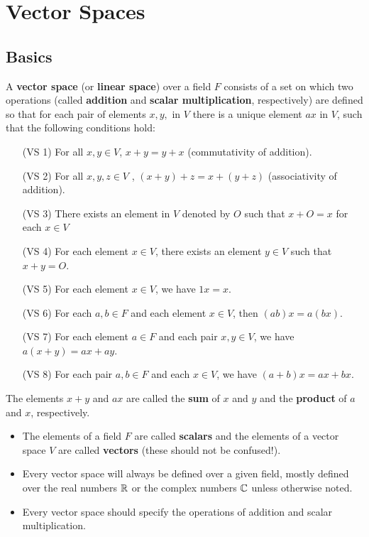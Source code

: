 \section{Vector Spaces}

\subsection{Basics}


\begin{definition}
    A \textbf{vector space} (or \textbf{linear space}) over a field \( F \) consists of a set on which two operations (called \textbf{addition} and \textbf{scalar multiplication}, respectively) are defined so that for each pair of elements \( x,y, \) in \( V \) there is a unique element \( ax  \) in \( V  \), such that the following conditions hold:
    \begin{enumerate}
        \item[(VS 1)] For all \( x,y   \in V \), \( x + y = y + x  \) (commutativity of addition).
        \item[(VS 2)] For all \( x, y, z  \in V  \) , \( (x+y) + z = x + (y + z)  \) (associativity of addition).
        \item[(VS 3)] There exists an element in \( V  \) denoted by \( O  \) such that \( x + O = x  \) for each \( x  \in V \) 
        \item[(VS 4)] For each element \( x \in V  \), there exists an element \( y \in V  \) such that \( x + y = O \).
        \item[(VS 5)] For each element \( x \in V  \), we have \( 1x = x  \).
        \item[(VS 6)] For each \( a,b \in F  \) and each element \( x \in V  \), then \( (ab)x = a(bx) \). 
        \item[(VS 7)] For each element \( a \in F  \) and each pair \( x,y \in V  \), we have \( a(x+y) = ax + ay \).
        \item[(VS 8)]  For each pair \( a,b \in F  \) and each \( x \in V  \), we have \( (a+b)x = ax + bx \).
    \end{enumerate} 
The elements \( x + y  \) and \( a x  \) are called the \textbf{sum} of \( x  \) and \( y  \) and the \textbf{product} of \( a  \) and \( x  \), respectively.
\end{definition}

\begin{itemize}
    \item The elements of a field \( F  \) are called \textbf{scalars} and the elements of a vector space \( V  \) are called \textbf{vectors} (these should not be confused!).
    \item Every vector space will always be defined over a given field, mostly defined over the real numbers \( \mathbb{R}  \) or the complex numbers \( \mathbb{C}  \) unless otherwise noted.
    \item Every vector space should specify the operations of addition and scalar multiplication.
\end{itemize}

